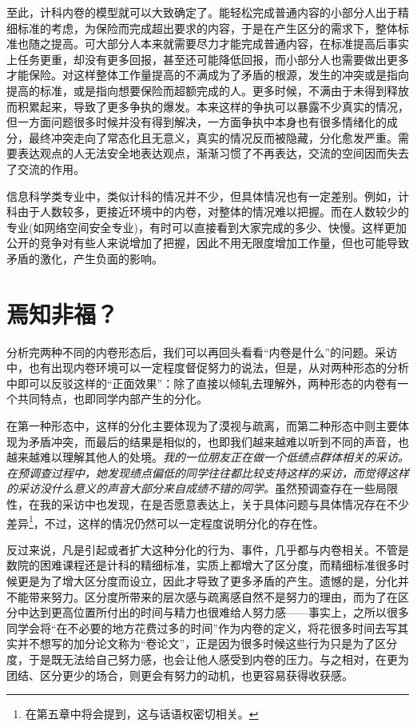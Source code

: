 \documentclass[UTF8,a4paper,fontset=windows,11pt,openany]{ctexbook}
\begin{document}
至此，计科内卷的模型就可以大致确定了。能轻松完成普通内容的小部分人出于精细标准的考虑，为保险而完成超出要求的内容，于是在产生区分的需求下，整体标准也随之提高。可大部分人本来就需要尽力才能完成普通内容，在标准提高后事实上任务更重，却没有更多回报，甚至还可能降低回报，而小部分人也需要做出更多才能保险。对这样整体工作量提高的不满成为了矛盾的根源，发生的冲突或是指向提高的标准，或是指向想要保险而超额完成的人。更多时候，不满由于未得到释放而积累起来，导致了更多争执的爆发。本来这样的争执可以暴露不少真实的情况，但一方面问题很多时候并没有得到解决，一方面争执中本身也有很多情绪化的成分，最终冲突走向了常态化且无意义，真实的情况反而被隐藏，分化愈发严重。需要表达观点的人无法安全地表达观点，渐渐习惯了不再表达，交流的空间因而失去了交流的作用。

信息科学类专业中，类似计科的情况并不少，但具体情况也有一定差别。例如，计科由于人数较多，更接近环境中的内卷，对整体的情况难以把握。而在人数较少的专业(如网络空间安全专业)，有时可以直接看到大家完成的多少、快慢。这样更加公开的竞争对有些人来说增加了把握，因此不用无限度增加工作量，但也可能导致矛盾的激化，产生负面的影响。

\section{焉知非福？}

分析完两种不同的内卷形态后，我们可以再回头看看“内卷是什么”的问题。采访中，也有出现内卷环境可以一定程度督促努力的说法，但是，从对两种形态的分析中即可以反驳这样的“正面效果”：除了直接以倾轧去理解外，两种形态的内卷有一个共同特点，也即同学内部产生的分化。

在第一种形态中，这样的分化主要体现为了漠视与疏离，而第二种形态中则主要体现为矛盾冲突，而最后的结果是相似的，也即我们越来越难以听到不同的声音，也越来越难以理解其他人的处境。\emph{我的一位朋友正在做一个低绩点群体相关的采访。在预调查过程中，她发现绩点偏低的同学往往都比较支持这样的采访，而觉得这样的采访没什么意义的声音大部分来自成绩不错的同学。}虽然预调查存在一些局限性，在我的采访中也发现，在是否愿意表达上，关于具体问题与具体情况存在不少差异\footnote{在第五章中将会提到，这与话语权密切相关。}，不过，这样的情况仍然可以一定程度说明分化的存在性。

反过来说，凡是引起或者扩大这种分化的行为、事件，几乎都与内卷相关。不管是数院的困难课程还是计科的精细标准，实质上都增大了区分度，而精细标准很多时候更是为了增大区分度而设立，因此才导致了更多矛盾的产生。遗憾的是，分化并不能带来努力。区分度所带来的层次感与疏离感自然不是努力的理由，而为了在区分中达到更高位置所付出的时间与精力也很难给人努力感——事实上，之所以很多同学会将“在不必要的地方花费过多的时间”作为内卷的定义，将花很多时间去写其实并不想写的加分论文称为“卷论文”，正是因为很多时候这些行为只是为了区分度，于是既无法给自己努力感，也会让他人感受到内卷的压力。与之相对，在更为团结、区分更少的场合，则更会有努力的动机，也更容易获得收获感。
\end{document}
